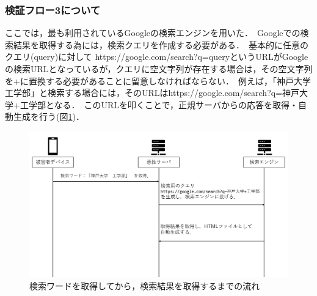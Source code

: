 \documentclass[dvipdfmx]{jsarticle}
\begin{document}
            \subsubsection{検証フロー3について}
                ここでは，最も利用されているGoogleの検索エンジンを用いた．\
                Googleでの検索結果を取得する為には，検索クエリを作成する必要がある．\
                基本的に任意のクエリ(query)に対して https://google.com/search?q=queryというURLがGoogleの検索URLとなっているが，クエリに空文字列が存在する場合は，その空文字列を+に置換する必要があることに留意しなければならない．\
                例えば，「神戸大学　工学部」と検索する場合には，そのURLはhttps://google.com/search?q=神戸大学+工学部となる．\
                このURLを叩くことで，正規サーバからの応答を取得・自動生成を行う(図\ref{flow-no3})．\\
                \begin{figure}[pth]
                    \centering
                    \includegraphics[width=12cm]{img/vc-vf-3.png}
                    \caption{検索ワードを取得してから，検索結果を取得するまでの流れ}
                    \label{flow-no3} 
                \end{figure}
                \clearpage
\end{document}
